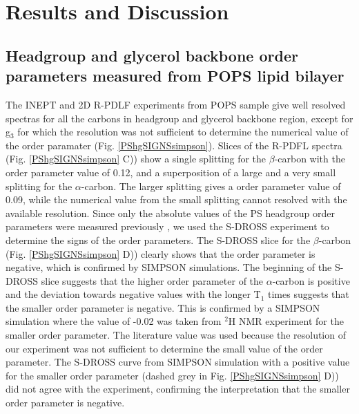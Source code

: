 \documentclass[aps,prl,superscriptaddress,twocolumn]{revtex4}
\begin{document}
\section{Results and Discussion}

\subsection{Headgroup and glycerol backbone order parameters measured from POPS lipid bilayer}

The INEPT and 2D R-PDLF experiments from POPS sample give well resolved spectras for all the
carbons in headgroup and glycerol backbone region, except for g$_3$ for which the resolution
was not sufficient to determine the numerical value of the order paramater (Fig. \ref{PShgSIGNSsimpson}).
Slices of the R-PDFL spectra (Fig. \ref{PShgSIGNSsimpson} C)) 
show a single splitting for the $\beta$-carbon with the order parameter value of 0.12,
and a superposition of a large and a very small splitting for the $\alpha$-carbon.
The larger splitting gives a order parameter value of 0.09, while the numerical value
from the small splitting cannot resolved with the available resolution.
Since only the absolute values of the PS headgroup order parameters were measured
previously \cite{browning80,roux91}, we used the S-DROSS experiment \cite{??} to determine the signs of
the order parameters. The S-DROSS slice for the $\beta$-carbon (Fig. \ref{PShgSIGNSsimpson} D)) clearly shows that the
order parameter is negative, which is confirmed by SIMPSON simulations.
The beginning of the S-DROSS slice suggests that the higher order parameter of
the $\alpha$-carbon is positive and the deviation towards negative values with the longer T$_1$ times suggests
that the smaller order parameter is negative. This is confirmed by a SIMPSON simulation
where the value of -0.02 was taken from $^2$H NMR experiment \cite{roux91} for the smaller order parameter.
The literature value was used because the
resolution of our experiment was not sufficient to determine the
small value of the order parameter. The S-DROSS curve from
SIMPSON simulation with a positive value for the smaller order parameter
(dashed grey in Fig. \ref{PShgSIGNSsimpson} D)) did not agree with the experiment, 
confirming the interpretation that the smaller order parameter is negative.
\end{document}
